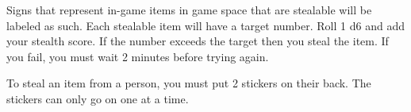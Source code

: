 \documentclass[green]{LRSguildcamp1}
\begin{document}
\name{\gStealing{}}

Signs that represent in-game items in game space that are stealable will be labeled as such. Each stealable item will have a target number. Roll 1 d6 and add your stealth score.  If the number exceeds the target then you steal the item. If you fail, you must wait 2 minutes before trying again.

To steal an item from a person, you must put 2 stickers on their back. The stickers can only go on one at a time. 
\end{document}
